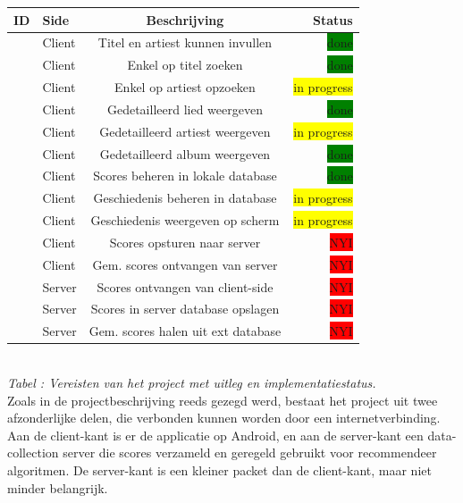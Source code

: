 \documentclass[11pt,a4paper]{article}
\newcommand{\boxgreen}{\colorbox{green}{\color{black}done}}
\newcommand{\boxyellow}{\colorbox{yellow}{\color{black}in progress}}
\newcommand{\boxred}{\colorbox{red}{\color{black}NYI}}
\newcounter{reqc}
\newcommand{\reqID} {%
   \stepcounter{reqc}%
   \thereqc}
\newcounter{tabc}
\newcommand{\tabID} {%
   \stepcounter{tabc}%
   \thetabc}
\begin{document}
	\begin{tabular}{| l | l | c | r |}
	\hline
	ID 		& 	Side	&	Beschrijving						& Status 		\\ \hline \hline
	\reqID	&	Client	&	Titel en artiest kunnen invullen	& \boxgreen 	\\ \hline
	\reqID 	&	Client	&	Enkel op titel zoeken				& \boxgreen		\\ \hline
	\reqID	& 	Client	&	Enkel op artiest opzoeken 			& \boxyellow	\\ \hline
	\reqID 	& 	Client	&	Gedetailleerd lied weergeven		& \boxgreen 	\\ \hline
	\reqID 	& 	Client	&	Gedetailleerd artiest weergeven		& \boxyellow 	\\ \hline
	\reqID 	& 	Client	&	Gedetailleerd album weergeven		& \boxgreen 	\\ \hline
	\reqID	& 	Client	&	Scores beheren in lokale database	& \boxgreen  	\\ \hline
	\reqID	& 	Client	&	Geschiedenis beheren in database	& \boxyellow  	\\ \hline
	\reqID	& 	Client	&	Geschiedenis weergeven op scherm	& \boxyellow  	\\ \hline
	\reqID	& 	Client	&	Scores opsturen naar server			& \boxred 		\\ \hline
	\reqID	& 	Client	&	Gem. scores ontvangen van server	& \boxred 		\\ \hline
	\reqID	& 	Server	&	Scores ontvangen van client-side	& \boxred 		\\ \hline
	\reqID	& 	Server	&	Scores in server database opslagen	& \boxred 		\\ \hline
	\reqID	& 	Server	&	Gem. scores halen uit ext database	& \boxred 		\\ \hline
	\end{tabular} \\ \newline
	\small \textit{Tabel \tabID : Vereisten van het project met uitleg en implementatiestatus.} \normalsize
	\\ \newline
	Zoals in de projectbeschrijving reeds gezegd werd, bestaat het project uit twee afzonderlijke delen, die verbonden kunnen worden door een internetverbinding. Aan de client-kant is er de applicatie op Android, en aan de server-kant een data-collection server die scores verzameld en geregeld gebruikt voor recommendeer algoritmen. De server-kant is een kleiner packet dan de client-kant, maar niet minder belangrijk. 
	\\ \newline
	
\end{document}
